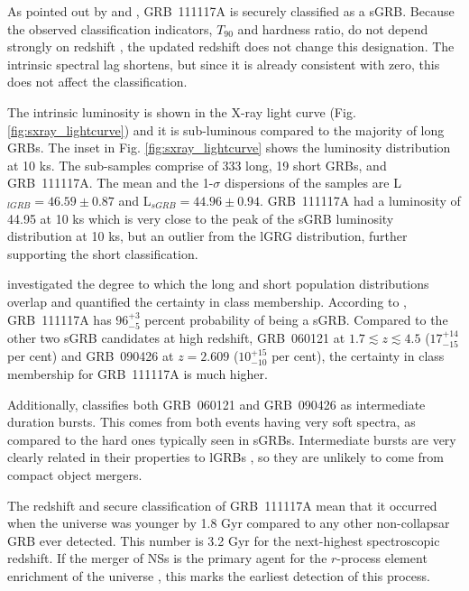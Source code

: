\documentclass{aa}    %
\begin{document}
As pointed out by \citet{Margutti2012} and \citet{Sakamoto2013}, GRB~111117A is
securely classified as a sGRB. Because the observed classification indicators,
$T_{90}$ and hardness ratio, do not depend strongly on redshift
\citep{Littlejohns2013a}, the updated redshift does not change this designation.
The intrinsic spectral lag shortens, but since it is already consistent with
zero, this does not affect the classification.

The intrinsic luminosity is shown in the X-ray light curve (Fig.
\ref{fig:sxray_lightcurve}) and it is sub-luminous compared to the majority of
long GRBs. The inset in Fig. \ref{fig:sxray_lightcurve} shows the luminosity
distribution at 10 ks. The sub-samples comprise of 333 long, 19 short GRBs, and
GRB~111117A. The mean and the 1-$\sigma$ dispersions of the samples are
L$_{lGRB} = 46.59 \pm 0.87$ and L$_{sGRB} = 44.96 \pm 0.94$. GRB~111117A had a
luminosity of 44.95 at 10 ks which is very close to the peak of the sGRB
luminosity distribution at 10 ks, but an outlier from the lGRG distribution,
further supporting the short classification.

\citet{Bromberg2013} investigated the degree to which the long and short
population distributions overlap and quantified the certainty in class
membership. According to \citet{Bromberg2013}, GRB~111117A has $96_{-5}^{+3}$
percent probability of being a sGRB. Compared to the other two sGRB candidates
at high redshift, GRB~060121 \citep{DeUgartePostigo2006, Levan2006} at $1.7
\lesssim z \lesssim 4.5$ ($17_{-15}^{+14}$ per cent) and GRB~090426
\citep{Antonelli2009, Levesque2010, Thone2011} at $z = 2.609$ ($10_{-10}^{+15}$
per cent), the certainty in class membership for GRB~111117A is much higher.

Additionally, \citet{Horvath2010} classifies both GRB~060121 and GRB~090426 as
intermediate duration bursts. This comes from both events having very soft
spectra, as compared to the hard ones typically seen in sGRBs. Intermediate
bursts are very clearly related in their properties to lGRBs
\citep{DeUgartePostigo2011}, so they are unlikely to come from compact object
mergers.

The redshift and secure classification of GRB~111117A mean that it occurred
when the universe was younger by 1.8 Gyr compared to any other non-collapsar GRB
ever detected. This number is 3.2 Gyr for the next-highest spectroscopic
redshift. If the merger of NSs is the primary agent for the $r$-process element
enrichment of the universe \citep{Goriely2011, Ji2016, Komiya2016}, this
marks the earliest detection of this process.
\end{document}
